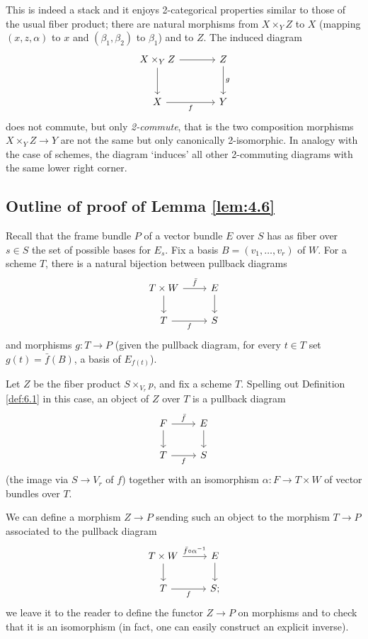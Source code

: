 \documentclass[12pt]{memoir}
\begin{document}
This is indeed a stack and it enjoys 2-categorical properties similar to those of the usual fiber product; there are natural morphisms from $X \times_Y Z$ to $X$ (mapping $(x, z, \alpha)$ to $x$ and $(\beta_1, \beta_2)$ to $\beta_1$) and to $Z$. The induced diagram
$$
\begin{tikzcd}[row sep=large, column sep=large]
X \times_Y Z \arrow[r] \arrow[d] & Z \arrow[d, "g"] \\
X \arrow[r, "f"'] & Y
\end{tikzcd}
$$
does not commute, but only \emph{2-commute}, that is the two composition morphisms $X \times_Y Z \to Y$ are not the same but only canonically 2-isomorphic. In analogy with the case of schemes, the diagram `induces' all other 2-commuting diagrams with the same lower right corner.

\subsection{Outline of proof of Lemma \ref{lem:4.6}}
\label{sec:proof-frame-bundle}

Recall that the frame bundle $P$ of a vector bundle $E$ over $S$ has as fiber over $s \in S$ the set of possible bases for $E_s$. Fix a basis $B = (v_1, \dots, v_r)$ of $W$. For a scheme $T$, there is a natural bijection between pullback diagrams
$$
\begin{tikzcd}
T \times W \arrow[r, "\bar{f}"] \arrow[d] & E \arrow[d] \\
T \arrow[r, "f"'] & S
\end{tikzcd}
$$
and morphisms $g\colon T \to P$ (given the pullback diagram, for every $t \in T$ set $g(t) = \bar{f}(B)$, a basis of $E_{f(t)}$).

Let $Z$ be the fiber product $S \times_{V_r} p$, and fix a scheme $T$. Spelling out Definition \ref{def:6.1} in this case, an object of $Z$ over $T$ is a pullback diagram
$$
\begin{tikzcd}
F \arrow[r, "\bar{f}"] \arrow[d] & E \arrow[d] \\
T \arrow[r, "f"'] & S
\end{tikzcd}
$$
(the image via $S \to V_r$ of $f$) together with an isomorphism $\alpha\colon F \to T \times W$ of vector bundles over $T$.

We can define a morphism $Z \to P$ sending such an object to the morphism $T \to P$ associated to the pullback diagram
$$
\begin{tikzcd}
T \times W \arrow[r, "\bar{f} \circ \alpha^{-1}"] \arrow[d] & E \arrow[d] \\
T \arrow[r, "f"'] & S;
\end{tikzcd}
$$
we leave it to the reader to define the functor $Z \to P$ on morphisms and to check that it is an isomorphism (in fact, one can easily construct an explicit inverse).
\end{document}
